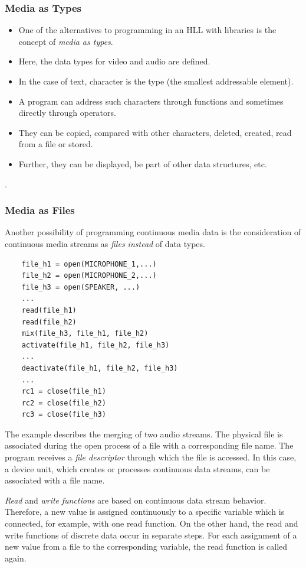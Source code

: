 \begin{multicols}{2}
	\subsubsection{Media as Types}
	\begin{itemize}
		\item One of the alternatives to programming in an HLL with libraries is the concept of \textit{media as types}.
		\item Here, the data types for video and audio are defined.
		\item In the case of text, character is the type (the smallest addressable element).
		\item A program can address such characters through functions and sometimes directly through operators. 
		\item They can be copied, compared with other characters, deleted, created, read from a file or stored. 
		\item Further, they can be displayed, be part of other data structures, etc.
	\end{itemize}
\end{multicols}

. 
\subsubsection{Media as Files}
	Another possibility of programming continuous media data is the consideration of continuous media streams as \textit{files instead} of data types.
\begin{lstlisting}
	file_h1 = open(MICROPHONE_1,...)
	file_h2 = open(MICROPHONE_2,...)
	file_h3 = open(SPEAKER, ...)
	...
	read(file_h1)
	read(file_h2)
	mix(file_h3, file_h1, file_h2)
	activate(file_h1, file_h2, file_h3)
	...
	deactivate(file_h1, file_h2, file_h3)
	...
	rc1 = close(file_h1)
	rc2 = close(file_h2)
	rc3 = close(file_h3)\end{lstlisting}

The example describes the merging of two audio streams. The physical file is associated during the open process of a file with a corresponding file name. The program receives a \textit{file descriptor} through which the file is accessed. In this case, a device unit, which creates or processes continuous data streams, can be associated with a file name.	

\textit{Read} and \textit{write} \textit{functions} are based on continuous data stream behavior. Therefore, a new value is assigned continuously to a specific variable which is connected, for example, with one read function. On the other hand, the read and write functions of discrete data occur in separate steps. For each assignment of a new value from a file to the corresponding variable, the read function is called again.

